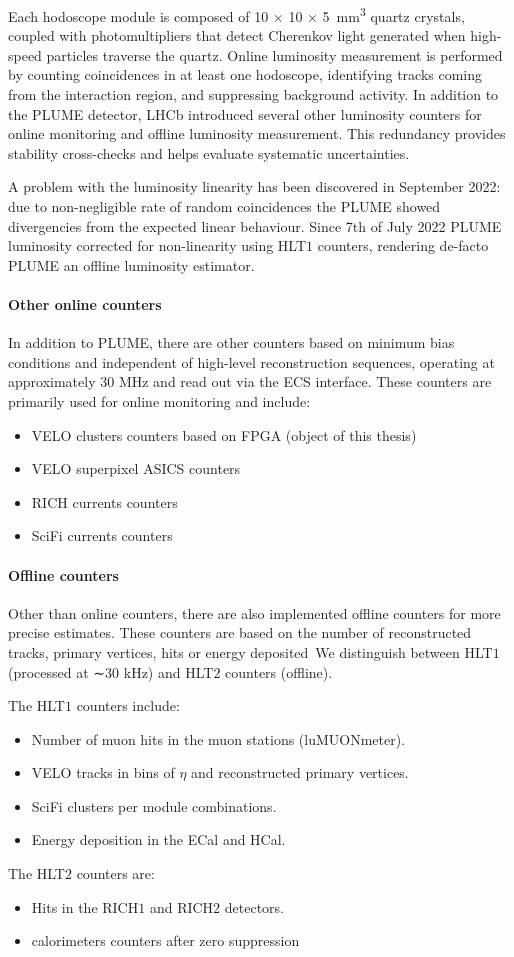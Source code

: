 Each hodoscope module is composed of 10 × 10 × \SI{5}{\milli\meter\tothe{3}} quartz crystals, coupled with photomultipliers that detect Cherenkov light generated when high-speed particles traverse the quartz. Online luminosity measurement is performed by counting coincidences in at least one hodoscope, identifying tracks coming from the interaction region, and suppressing background activity.
In addition to the PLUME detector, LHCb introduced several other luminosity counters for online monitoring and offline luminosity measurement. This redundancy provides stability cross-checks and helps evaluate systematic uncertainties.

A problem with the luminosity linearity has been discovered in September 2022: due to non-negligible rate of random coincidences the PLUME showed divergencies from the expected linear behaviour. Since 7th of July 2022 PLUME luminosity corrected for non-linearity using HLT$1$ counters, rendering de-facto PLUME an offline luminosity estimator.


\paragraph{Other online counters} 
In addition to PLUME, there are other counters based on minimum bias conditions and independent of high-level reconstruction sequences, operating at approximately 30 MHz and read out via the ECS interface. These counters are primarily used for online monitoring and include:
\begin{itemize}
   \item VELO clusters counters based on FPGA (object of this thesis)
   \item VELO superpixel ASICS counters
   \item RICH currents counters
   \item SciFi currents counters
\end{itemize}
\paragraph{Offline counters} 
Other than online counters, there are also implemented offline counters for more precise estimates.
These counters are based on the number of reconstructed tracks, primary vertices, hits or energy deposited\
We distinguish between HLT$1$ (processed at ∼30 kHz) and HLT$2$ counters (offline).

The HLT$1$ counters include:
\begin{itemize}
   \item Number of muon hits in the muon stations (luMUONmeter).
   \item  VELO tracks in bins of $\eta$ and reconstructed primary vertices.
   \item SciFi clusters per module combinations.
   \item Energy deposition in the ECal and HCal.
\end{itemize}
The HLT$2$ counters are:
\begin{itemize}
    \item Hits in the RICH$1$ and RICH$2$ detectors.
    \item calorimeters counters after zero suppression 
\end{itemize}

